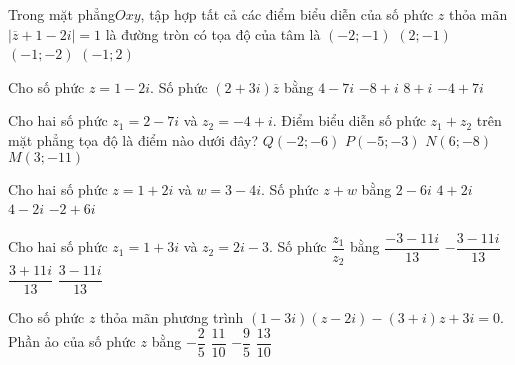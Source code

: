 \begin{ex}%
Trong mặt phẳng$Oxy$, tập hợp tất cả các điểm biểu diễn của số phức $ z$ thỏa mãn $| \overline{z}+1-2i |=1$ là đường tròn có tọa độ của tâm là
\choice
{ $( -2;-1 )$}
{ $( 2;-1 )$}
{\True $( -1;-2 )$}
{ $( -1;2 )$}
\end{ex}

\begin{ex}%
Cho số phức $z=1-2i$. Số phức $(2+3i)\overline{z}$ bằng
\choice
{$4-7i$}
{$-8+i$}
{$8+i$}
{\True $-4+7i$}
\end{ex}

\begin{ex}%
Cho hai số phức $z_1=2-7i$ và $z_2=-4+i$. Điểm biểu diễn số phức $z_1+z_2$ trên mặt phẳng tọa độ là điểm nào dưới đây?
\choice
{\True $Q(-2;-6)$}
{$P(-5;-3)$}
{$N(6;-8)$}
{$M(3;-11)$}
\end{ex}

\begin{ex}%
Cho hai số phức $z=1+2i$ và $w=3-4i$. Số phức $z+w$ bằng
\choice
{$2-6i$}
{$4+2i$}
{\True $4-2i$}
{$-2+6i$}
\end{ex}

\begin{ex}%
Cho hai số phức $z_1=1+3i$ và $z_2=2i-3$. Số phức $\dfrac{z_1}{z_2}$ bằng
\choice
{$\dfrac{-3-11i}{13}$}
{$-\dfrac{3-11i}{13}$}
{$\dfrac{3+11i}{13}$}
{\True $\dfrac{3-11i}{13}$}
\end{ex}

\begin{ex}%
Cho số phức $z$ thỏa mãn phương trình $(1-3i)(z-2i)-(3+i)z+3i=0$. Phần ảo của số phức $z$ bằng
\choice
{$-\dfrac{2}{5}$}
{$\dfrac{11}{10}$}
{$-\dfrac{9}{5}$}
{\True $\dfrac{13}{10}$}
\end{ex}

